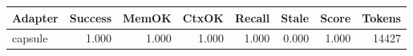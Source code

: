 \begin{tabular}{lrrrrrrr}
\hline
Adapter & Success & MemOK & CtxOK & Recall & Stale & Score & Tokens \\
\hline
capsule & 1.000 & 1.000 & 1.000 & 1.000 & 0.000 & 1.000 & 14427 \\
\hline
\end{tabular}
